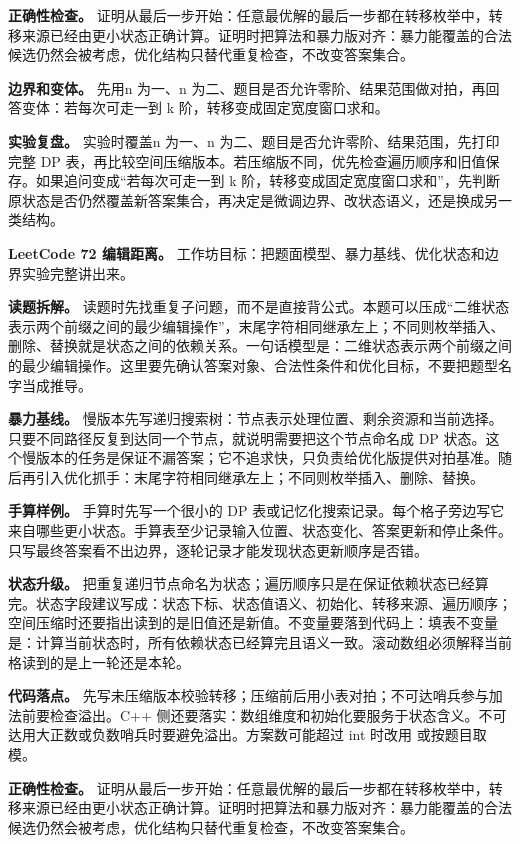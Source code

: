 \textbf{正确性检查。} 证明从最后一步开始：任意最优解的最后一步都在转移枚举中，转移来源已经由更小状态正确计算。证明时把算法和暴力版对齐：暴力能覆盖的合法候选仍然会被考虑，优化结构只替代重复检查，不改变答案集合。

\textbf{边界和变体。} 先用n 为一、n 为二、题目是否允许零阶、结果范围做对拍，再回答变体：若每次可走一到 k 阶，转移变成固定宽度窗口求和。

\textbf{实验复盘。} 实验时覆盖n 为一、n 为二、题目是否允许零阶、结果范围，先打印完整 DP 表，再比较空间压缩版本。若压缩版不同，优先检查遍历顺序和旧值保存。如果追问变成“若每次可走一到 k 阶，转移变成固定宽度窗口求和”，先判断原状态是否仍然覆盖新答案集合，再决定是微调边界、改状态语义，还是换成另一类结构。

\noindent\textbf{LeetCode 72 编辑距离。} 工作坊目标：把题面模型、暴力基线、优化状态和边界实验完整讲出来。

\textbf{读题拆解。} 读题时先找重复子问题，而不是直接背公式。本题可以压成“二维状态表示两个前缀之间的最少编辑操作”，末尾字符相同继承左上；不同则枚举插入、删除、替换就是状态之间的依赖关系。一句话模型是：二维状态表示两个前缀之间的最少编辑操作。这里要先确认答案对象、合法性条件和优化目标，不要把题型名字当成推导。

\textbf{暴力基线。} 慢版本先写递归搜索树：节点表示处理位置、剩余资源和当前选择。只要不同路径反复到达同一个节点，就说明需要把这个节点命名成 DP 状态。这个慢版本的任务是保证不漏答案；它不追求快，只负责给优化版提供对拍基准。随后再引入优化抓手：末尾字符相同继承左上；不同则枚举插入、删除、替换。

\textbf{手算样例。} 手算时先写一个很小的 DP 表或记忆化搜索记录。每个格子旁边写它来自哪些更小状态。手算表至少记录输入位置、状态变化、答案更新和停止条件。只写最终答案看不出边界，逐轮记录才能发现状态更新顺序是否错。

\textbf{状态升级。} 把重复递归节点命名为状态；遍历顺序只是在保证依赖状态已经算完。状态字段建议写成：状态下标、状态值语义、初始化、转移来源、遍历顺序；空间压缩时还要指出读到的是旧值还是新值。不变量要落到代码上：填表不变量是：计算当前状态时，所有依赖状态已经算完且语义一致。滚动数组必须解释当前格读到的是上一轮还是本轮。

\textbf{代码落点。} 先写未压缩版本校验转移；压缩前后用小表对拍；不可达哨兵参与加法前要检查溢出。C++ 侧还要落实：数组维度和初始化要服务于状态含义。不可达用大正数或负数哨兵时要避免溢出。方案数可能超过 int 时改用  或按题目取模。

\textbf{正确性检查。} 证明从最后一步开始：任意最优解的最后一步都在转移枚举中，转移来源已经由更小状态正确计算。证明时把算法和暴力版对齐：暴力能覆盖的合法候选仍然会被考虑，优化结构只替代重复检查，不改变答案集合。


